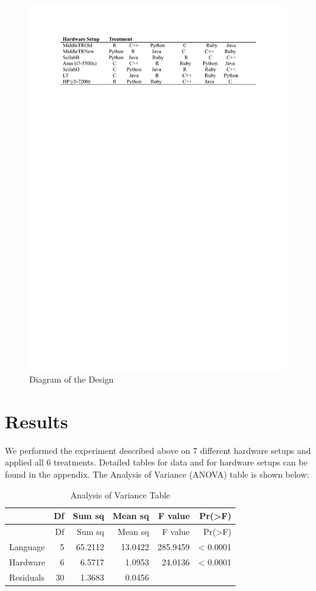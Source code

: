 \documentclass[12pt,halfline,a4paper,]{ouparticle}
\begin{document}
\begin{figure}[H]
\includegraphics[width=1\linewidth]{diagram} \caption{Diagram of the Design}\label{fig:unnamed-chunk-1}
\end{figure}
\newpage

\hypertarget{results}{%
\section{Results}\label{results}}

We performed the experiment described above on 7 different hardware
setups and applied all 6 treatments. Detailed tables for data and for
hardware setups can be found in the appendix. The Analysis of Variance
(ANOVA) table is shown below:

\begin{longtable}[]{@{}lrrrrr@{}}
\caption{Analysis of Variance Table}\tabularnewline
\toprule\noalign{}
& Df & Sum sq & Mean sq & F value & Pr(\textgreater F) \\
\midrule\noalign{}
\endfirsthead
\toprule\noalign{}
& Df & Sum sq & Mean sq & F value & Pr(\textgreater F) \\
\midrule\noalign{}
\endhead
\bottomrule\noalign{}
\endlastfoot
Language & 5 & 65.2112 & 13.0422 & 285.9459 & \textless{} 0.0001 \\
Hardware & 6 & 6.5717 & 1.0953 & 24.0136 & \textless{} 0.0001 \\
Residuals & 30 & 1.3683 & 0.0456 & & \\
\end{longtable}
\end{document}
